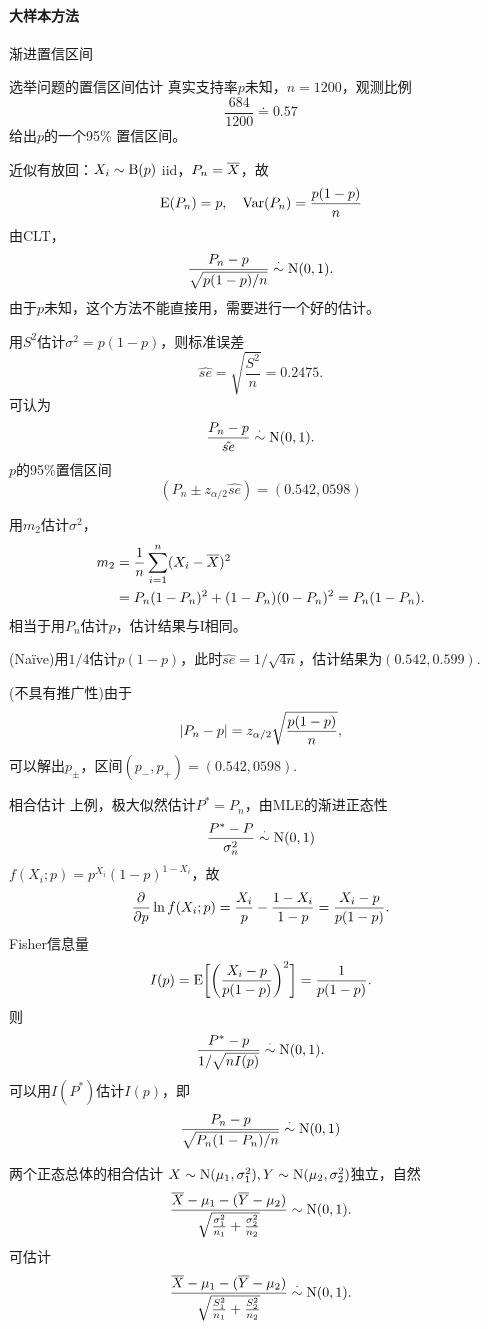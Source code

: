 \paragraph{大样本方法}
渐进置信区间
\begin{example}{选举问题的置信区间估计}{}
	真实支持率$p$未知，$n=1200$，观测比例
	\[
		\frac{684}{1200}\doteq 0.57
	\]
	给出$p$的一个95\% 置信区间。

	近似有放回：$X_i\sim\operatorname{B}(p)$ iid，$P_n=\overline{X}$，故
	\[
		\operatorname{E}(P_n)=p,\quad\operatorname{Var}(P_n)=\frac{p(1-p)}n
	\]
	由CLT，
	\[
		\frac{P_n-p}{\sqrt{p(1-p)/n}}\overset\cdot\sim\operatorname{N}(0,1).
	\]
	由于$p$未知，这个方法不能直接用，需要进行一个好的估计。
	\begin{compactenum}[I]
		\item 用$S^2$估计$\sigma^2=p(1-p)$，则标准误差
			\[
				\hat{se}=\sqrt{\frac{S^2}n}=0.2475.
			\]
			可认为
			\[
				\frac{P_n-p}{\hat{se}}\overset\cdot\sim\operatorname{N}(0,1).
			\]
			$p$的95\%置信区间
			\[
				(P_n\pm z_{\alpha/2}\hat{se})=(0.542,0598)
			\]
		\item 用$m_2$估计$\sigma^2$，
			\begin{align*}
				m_2&=\frac1n\sum_{i=1}^n(X_i-\overline{X})^2\\
				&=P_n(1-P_n)^2+(1-P_n)(0-P_n)^2=P_n(1-P_n).
			\end{align*}
			相当于用$P_n$估计$p$，估计结果与I相同。
		\item (Naïve)用$1/4$估计$p(1-p)$，此时$\hat{se}=1/\sqrt{4n}$，估计结果为$(0.542,0.599).$
		\item (不具有推广性)由于 
		\[
			\left\lvert P_n-p\right\rvert=z_{\alpha/2}\sqrt{\frac{p(1-p)}n},
		\]
		可以解出$p_\pm$，区间$(p_-,p_+)=(0.542,0598).$
	\end{compactenum}
\end{example}
\begin{example}{相合估计}{}
	上例，极大似然估计$P^\ast=P_n$，由MLE的渐进正态性
	\[
		\frac{P^\ast-P}{\sigma_n^2}\overset\cdot\sim\operatorname{N}(0,1)
	\]
	$f(X_i;p)=p^{X_i}(1-p)^{1-X_i}$，故
	\[
		\frac{\partial^{{}}}{\partial{p}^{{}}}\ln f(X_i;p)=\frac{X_i}p-\frac{1-X_i}{1-p}=\frac{X_i-p}{p(1-p)}.
	\]
	Fisher信息量
	\[
		I(p)=\operatorname{E}\biggl[\biggl(\frac{X_i-p}{p(1-p)}\biggr)^2\biggr]=\frac1{p(1-p)}.
	\]
	则
	\[
		\frac{P^\ast-p}{1/\sqrt{nI(p)}}\overset\cdot\sim\operatorname{N}(0,1).
	\]
	可以用$I(P^\ast)$估计$I(p)$，即
	\[
		\frac{P_n-p}{\sqrt{P_n(1-P_n)/n}}\overset\cdot\sim\operatorname{N}(0,1)
	\]
\end{example}
\begin{example}{两个正态总体的相合估计}{}
	$X\sim\operatorname{N}(\mu_1,\sigma_1^2),Y\sim\operatorname{N}(\mu_2,\sigma_2^2)$独立，自然
	\[
		\frac{\overline{X}-\mu_1-(\overline{Y}-\mu_2)}{\sqrt{\frac{\sigma_1^2}{n_1}+\frac{\sigma_2^2}{n_2}}}\sim\operatorname{N}(0,1).
	\]
	可估计
	\[
		\frac{\overline{X}-\mu_1-(\overline{Y}-\mu_2)}{\sqrt{\frac{S_1^2}{n_1}+\frac{S_2^2}{n_2}}}\overset\cdot\sim\operatorname{N}(0,1).
	\]
\end{example}
